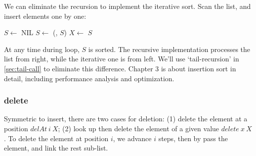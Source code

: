 \documentclass[b5paper]{article}
\begin{document}
We can eliminate the recursion to implement the iterative sort. Scan the list, and insert elements one by one:

\begin{algorithmic}[1]
  \State $S \gets$ NIL
    \State $S \gets$ (, $S$)
    \State $X \gets$ 
  \EndWhile
  \State \Return $S$
\EndFunction
\end{algorithmic}

At any time during loop, $S$ is sorted. The recursive implementation processes the list from right, while the iterative one is from left. We'll use `tail-recursion' in \cref{sec:tail-call} to eliminate this difference. Chapter 3 is about insertion sort in detail, including performance analysis and optimization.

\begin{Exercise}[label={ex:list-insert}]
\end{Exercise}

\begin{Answer}[ref = {ex:list-insert}]
\end{Answer}

\subsubsection{delete}
 
Symmetric to insert, there are two cases for deletion: (1) delete the element at a position $delAt\ i\ X$; (2) look up then delete the element of a given value $delete\ x\ X$. To delete the element at position $i$, we advance $i$ steps, then by pass the element, and link the rest sub-list.
\end{document}
